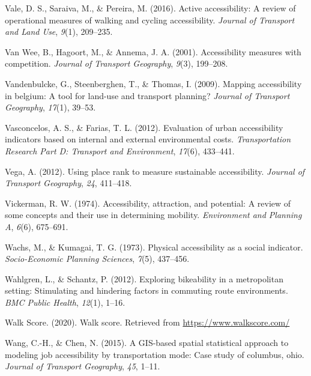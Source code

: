 \documentclass[
11pt, %
oneside, %
english, %
singlespacing, %
]{macthesis} %
\newlength{\cslhangindent}
\newenvironment{CSLReferences}[2] %
{\begin{list}{}{%
	\setlength{\itemindent}{0pt}
	\setlength{\leftmargin}{0pt}
	\setlength{\parsep}{0pt}
	\ifodd #1
	\setlength{\leftmargin}{\cslhangindent}
	\setlength{\itemindent}{-1\cslhangindent}
	\fi
	\setlength{\itemsep}{#2\baselineskip}}}
{\end{list}}
\begin{document}
\begin{CSLReferences}{1}{0}
Vale, D. S., Saraiva, M., \& Pereira, M. (2016). Active accessibility: A review of operational measures of walking and cycling accessibility. \emph{Journal of Transport and Land Use}, \emph{9}(1), 209--235.

Van Wee, B., Hagoort, M., \& Annema, J. A. (2001). Accessibility measures with competition. \emph{Journal of Transport Geography}, \emph{9}(3), 199--208.

Vandenbulcke, G., Steenberghen, T., \& Thomas, I. (2009). Mapping accessibility in belgium: A tool for land-use and transport planning? \emph{Journal of Transport Geography}, \emph{17}(1), 39--53.

Vasconcelos, A. S., \& Farias, T. L. (2012). Evaluation of urban accessibility indicators based on internal and external environmental costs. \emph{Transportation Research Part D: Transport and Environment}, \emph{17}(6), 433--441.

Vega, A. (2012). Using place rank to measure sustainable accessibility. \emph{Journal of Transport Geography}, \emph{24}, 411--418.

Vickerman, R. W. (1974). Accessibility, attraction, and potential: A review of some concepts and their use in determining mobility. \emph{Environment and Planning A}, \emph{6}(6), 675--691.

Wachs, M., \& Kumagai, T. G. (1973). Physical accessibility as a social indicator. \emph{Socio-Economic Planning Sciences}, \emph{7}(5), 437--456.

Wahlgren, L., \& Schantz, P. (2012). Exploring bikeability in a metropolitan setting: Stimulating and hindering factors in commuting route environments. \emph{BMC Public Health}, \emph{12}(1), 1--16.

Walk Score. (2020). Walk score. Retrieved from \url{https://www.walkscore.com/}

Wang, C.-H., \& Chen, N. (2015). A GIS-based spatial statistical approach to modeling job accessibility by transportation mode: Case study of columbus, ohio. \emph{Journal of Transport Geography}, \emph{45}, 1--11.


\end{CSLReferences}
\end{document}
